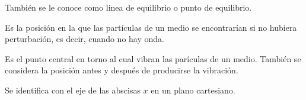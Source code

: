 También se le conoce como linea de equilibrio o punto de equilibrio.

Es la posición en la que las partículas de un medio se encontrarían si no hubiera perturbación, es decir, cuando no hay onda.

Es el punto central en torno al cual vibran las parículas de un medio. También se considera la posición antes y después de producirse la vibración.

Se identifica con el eje de las abscisas $x$ en un plano cartesiano.

